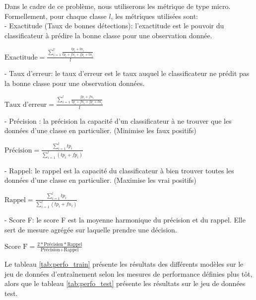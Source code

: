 Dans le cadre de ce problème, nous utiliserons les métrique de type micro. Formellement, pour chaque classe $l$, les métriques utilisées sont: \\


- Exactitude (Taux de bonnes détections): l'exactitude est le pouvoir du classificateur à prédire la bonne classe pour une observation donnée.\\
\begin{center}
	$\textrm{Exactitude} = \frac{\sum_{i=1}^{l} \frac{tp_i +tn_i}{tp_i + fn_i + fp_i+ tn_i}}{l}$
\end{center}
	
- Taux d'erreur: le taux d'erreur est le taux auquel le classificateur ne prédit pas la bonne classe pour une observation données.\\ 
\begin{center}
	$\textrm{Taux d'erreur} = \frac{\sum_{i=1}^{l} \frac{fp_i +fn_i}{tp_i + fn_i + fp_i+ tn_i}}{l}$
\end{center}

- Précision : la précision la capacité d'un classificateur à ne trouver que les données d'une classe en particulier. (Minimise les faux positifs) \\
\begin{center}
	$\textrm{Précision} = \frac{\sum_{i=1}^{l} tp_i}{\sum_{i=1}^{l} (tp_i + fp_i)}$
\end{center}

- Rappel: le rappel est la capacité du classificateur à bien trouver toutes les données d'une classe en particulier. (Maximise les vrai positifs)\\
\begin{center}
	$\textrm{Rappel} = \frac{\sum_{i=1}^{l} tp_i}{\sum_{i=1}^{l} (tp_i + fn_i)}$
\end{center}

- Score F: le score F est la moyenne harmonique du précision et du rappel. Elle sert de mesure agrégée sur laquelle prendre une décision.\\
\begin{center}
	$\textrm{Score F} = \frac{2 * \textrm{Précision} * \textrm{Rappel}}{\textrm{Précision} + \textrm{Rappel}}$
\end{center}


Le tableau \ref{tab:perfo_train} présente les résultats des différents modèles sur le jeu de données d'entraînement selon les mesures de performance définies plus tôt, alors que le tableau \ref{tab:perfo_test} présente les résultats sur le jeu de données test.

